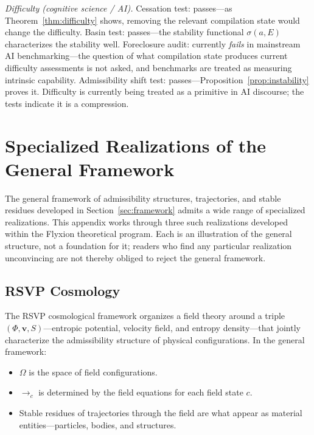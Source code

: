 \documentclass[12pt, a4paper]{article}
\theoremstyle{plain}
\theoremstyle{definition}
\theoremstyle{remark}
\begin{document}
\textit{Difficulty (cognitive science / AI).} Cessation test: passes---as
Theorem~\ref{thm:difficulty} shows, removing the relevant compilation state
would change the difficulty. Basin test: passes---the stability functional
$\sigma(a, E)$ characterizes the stability well. Foreclosure audit: currently
\emph{fails} in mainstream AI benchmarking---the question of what compilation
state produces current difficulty assessments is not asked, and benchmarks
are treated as measuring intrinsic capability. Admissibility shift test:
passes---Proposition~\ref{prop:instability} proves it. Difficulty is currently
being treated as a primitive in AI discourse; the tests indicate it is a
compression.

\section{Specialized Realizations of the General Framework}
\label{app:realizations}

The general framework of admissibility structures, trajectories, and stable
residues developed in Section~\ref{sec:framework} admits a wide range of
specialized realizations. This appendix works through three such realizations
developed within the Flyxion theoretical program. Each is an illustration
of the general structure, not a foundation for it; readers who find any
particular realization unconvincing are not thereby obliged to reject the
general framework.

\subsection{RSVP Cosmology}

The RSVP cosmological framework organizes a field theory around a triple
$(\Phi, \mathbf{v}, S)$---entropic potential, velocity field, and entropy
density---that jointly characterize the admissibility structure of physical
configurations. In the general framework:

\begin{itemize}[leftmargin=*]
\item $\Omega$ is the space of field configurations.
\item $\to_c$ is determined by the field equations for each field state $c$.
\item Stable residues of trajectories through the field are what appear as
material entities---particles, bodies, and structures.
\end{itemize}
\end{document}
